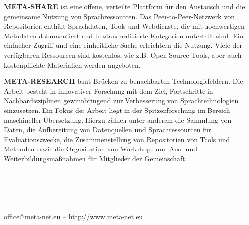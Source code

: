 \begin{multicols}{2}
\textbf{META-SHARE} ist eine offene, verteilte Plattform für den Austausch und die gemeinsame Nutzung von Sprachressourcen. Das Peer-to-Peer-Netzwerk von Repositorien enthält Sprachdaten, Tools und Webdienste, die mit hochwertigen Metadaten dokumentiert und in standardisierte Kategorien unterteilt sind. 
Ein einfacher Zugriff und eine einheitliche Suche erleichtern die Nutzung. 
Viele der verfügbaren Ressourcen sind kostenlos,  wie z.B. Open-Source-Tools, aber auch kostenpflichte Materialien werden angeboten. 

\textbf{META-RESEARCH} baut Brücken zu benachbarten Technologiefeldern. Die Arbeit besteht in innovativer Forschung mit dem Ziel, Fortschritte in Nachbardisziplinen gewinnbringend zur Verbesserung von Sprachtechnologien einzusetzen. 
Ein Fokus der Arbeit liegt in der Spitzenforschung im Bereich maschineller Übersetzung.  
Hierzu zählen unter anderem die Sammlung von Daten, die Aufbereitung von Datenquellen und Sprachressourcen für Evaluationszwecke, die Zusammenstellung von Repositorien von Tools und Methoden sowie die Organisation von Workshops und Aus- und Weiterbildungsmaßnahmen für Mitglieder der Gemeinschaft.
\end{multicols}

\vfill

\makeatletter
{}
{
  \renewcommand*{\theHsection}{\thepart.\thesection}
}
\makeatother
\part*{\textcolor{white}{English}}
\setcounter{section}{0}
\setcounter{figure}{0}

\centerline{office@meta-net.eu -- http://www.meta-net.eu}


\cleardoublepage





